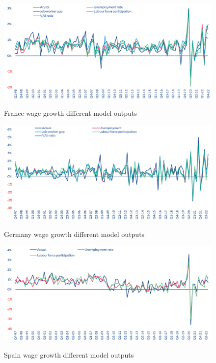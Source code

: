 \begin{figure}[H]
    \centering
    \caption{France wage growth different model outputs}
    \includegraphics[width=.95\textwidth]{Core/2.Labour/img/France output.png}
    \label{figure:fr_output}
\end{figure}

\begin{figure}[H]
    \centering
    \caption{Germany wage growth different model outputs}
    \includegraphics[width=.95\textwidth]{Core/2.Labour/img/Germany output.png}
    \label{figure:ger_output}
\end{figure}

\begin{figure}[H]
    \centering
    \caption{Spain wage growth different model outputs}
    \includegraphics[width=.95\textwidth]{Core/2.Labour/img/Spain output.png}
    \label{figure:sp_output}
\end{figure}

